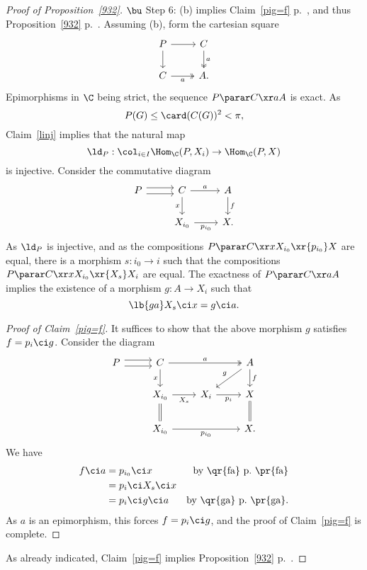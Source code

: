 \documentclass[12pt]{article}
\theoremstyle{remark}
\theoremstyle{definition}
\begin{document}
\begin{proof}[Proof of Proposition~\ref{932}]
\nn$\bu$ Step 6: (b) implies Claim~\ref{pig=f} p.~, and thus Proposition~\ref{932} p.~. Assuming (b), form the cartesian square 
$$
\begin{tikzcd}
P\ar{r}\ar{d}&C\ar[two heads]{d}{a}\\ 
C\ar[two heads]{r}[swap]{a}&A.
\end{tikzcd}
$$
Epimorphisms in $\C$ being strict, the sequence $P\parar C\xr aA$ is exact. As 
$$
P(G)\le\card(C(G))^2<\pi,
$$ 
Claim~\ref{linj} implies that the natural map 
$$
\ld_P:\col_{i\in I}\Hom_\C(P,X_i)\to\Hom_\C(P,X)
$$ 
is injective. Consider the commutative diagram 
$$
\begin{tikzcd}
P\ar[yshift=0.7ex]{r}\ar[yshift=-0.7ex]{r}&C\ar{r}{a}\ar{d}[swap]{x}&A\ar{d}{f}\\ 
{}&X_{i_0}\ar{r}[swap]{p_{i_0}}&X.
\end{tikzcd}
$$ 
As $\ld_P$ is injective, and as the compositions $P\parar C\xr xX_{i_0}\xr{p_{i_0}}X$ are equal, there is a morphism $s:i_0\to i$ such that the compositions $P\parar C\xr xX_{i_0}\xr{X_s} X_i$ are equal. The exactness of $P\parar C\xr aA$ implies the existence of a morphism $g:A\to X_i$ such that 
\begin{equation}\lb{ga}
X_s\ci x=g\ci a.
\end{equation}

\begin{proof}[Proof of Claim~\ref{pig=f}]
It suffices to show that the above morphism $g$ satisfies $f=p_i\ci g$. Consider the diagram 
$$
\begin{tikzcd}
P\ar[yshift=0.7ex]{r}\ar[yshift=-0.7ex]{r}&C\ar{d}[swap]{x}\ar[two heads]{rr}{a}&&A\ar{dl}[swap]{g}\ar{d}{f}\\ 
{}&X_{i_0}\ar{r}[swap]{X_s}\ar[equal]{d}&X_i\ar{r}[swap]{p_i}&X\ar[equal]{d}\\ 
{}&X_{i_0}\ar{rr}[swap]{p_{i_0}}&&X.
\end{tikzcd}
$$ 
We have 
\begin{align*}
f\ci a&=p_{i_0}\ci x&\text{by \qr{fa} p.~\pr{fa}}\\ 
&=p_i\ci X_s\ci x\\ 
&=p_i\ci g\ci a&\text{by \qr{ga} p.~\pr{ga}}.
\end{align*} 
As $a$ is an epimorphism, this forces $f=p_i\ci g$, and the proof of Claim~\ref{pig=f} is complete. 
\end{proof} 

As already indicated, Claim~\ref{pig=f} implies Proposition~\ref{932} p.~. 
\end{proof}  
\end{document}
